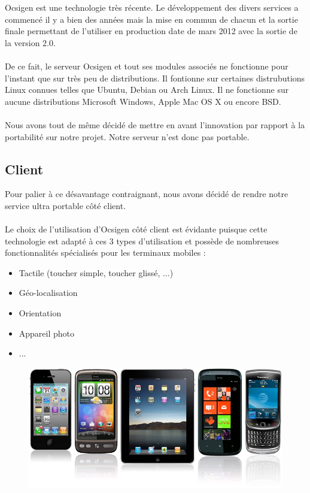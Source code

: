 \documentclass{life-fr}
\begin{document}
Ocsigen est une technologie très récente. Le développement des divers services a
commencé il y a bien des années mais la mise en commun de chacun et la sortie
finale permettant de l'utiliser en production date de mars 2012 avec la sortie
de la version 2.0.\\
\\
De ce fait, le serveur Ocsigen et tout ses modules associés ne fonctionne
pour l'instant que sur très peu de distributions. Il fontionne sur certaines
distrubutions Linux connues telles que Ubuntu, Debian ou Arch Linux. Il ne
fonctionne sur aucune distributions Microsoft Windows, Apple Mac OS X ou encore
BSD.\\
\\
Nous avons tout de même décidé de mettre en avant l'innovation par rapport
à la portabilité sur notre projet. Notre serveur n'est donc pas portable.

\subsection{Client}

Pour palier à ce désavantage contraignant, nous avons décidé de rendre notre
service ultra portable côté client.\\
\\
Le choix de l'utilisation d'Ocsigen côté client est évidante puisque cette
technologie est adapté à ces 3 types d'utilisation et possède de nombreuses
fonctionnalités spécialisés pour les terminaux mobiles :
\begin{itemize}
  \item Tactile (toucher simple, toucher glissé, ...)
  \item Géo-localisation
  \item Orientation
  \item Appareil photo
  \item ...
\end{itemize}

\begin{figure}[H]
  \begin{center}
    \includegraphics[width=13cm]{img/mobiles.jpg}
  \end{center}
\end{figure}
\end{document}
